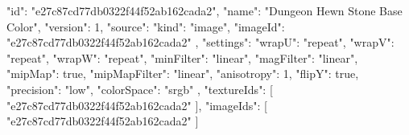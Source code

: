 {
  "id": "e27c87cd77db0322f44f52ab162cada2",
  "name": "Dungeon Hewn Stone Base Color",
  "version": 1,
  "source": {
    "kind": "image",
    "imageId": "e27c87cd77db0322f44f52ab162cada2"
  },
  "settings": {
    "wrapU": "repeat",
    "wrapV": "repeat",
    "wrapW": "repeat",
    "minFilter": "linear",
    "magFilter": "linear",
    "mipMap": true,
    "mipMapFilter": "linear",
    "anisotropy": 1,
    "flipY": true,
    "precision": "low",
    "colorSpace": "srgb"
  },
  "textureIds": [
    "e27c87cd77db0322f44f52ab162cada2"
  ],
  "imageIds": [
    "e27c87cd77db0322f44f52ab162cada2"
  ]
}
